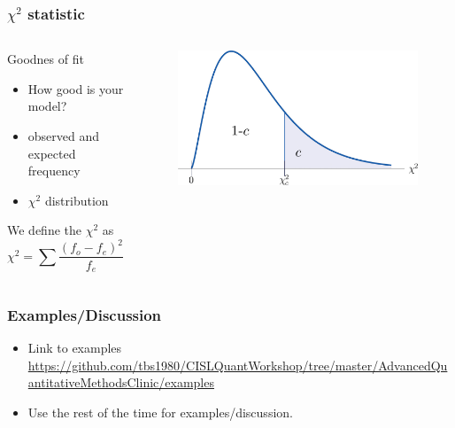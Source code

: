 \documentclass[10pt, compress]{beamer}
\begin{document}
\begin{frame}
    \frametitle{$\chi^2$ statistic}
    \begin{columns}
        \begin{block}{Goodnes of fit}
            \begin{itemize}
                \item How good is your model?
                \item observed and expected frequency
                \item $\chi^2$ distribution
            \end{itemize}
            We define the $\chi^2$ as
            \begin{equation}
                \chi^2 = \sum \frac{(f_o-f_e)^2}{f_e}
            \end{equation}
        \end{block}
        \begin{block}{}
            \begin{figure}
                \begin{center}
                    \includegraphics[scale=0.4]{img/chi2.jpg}
                \end{center}
            \end{figure}
        \end{block}
    \end{columns}
\end{frame}

\begin{frame}
    \frametitle{Examples/Discussion}
    \begin{itemize}
        \item Link to examples \url{https://github.com/tbs1980/CISLQuantWorkshop/tree/master/AdvancedQuantitativeMethodsClinic/examples}
        \item Use the rest of the time for examples/discussion.
    \end{itemize}
\end{frame}
\end{document}
